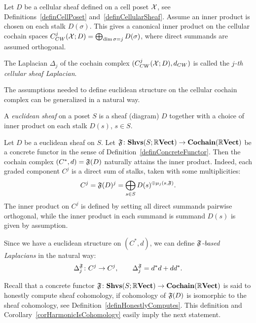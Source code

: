 \begin{con}\label{conInnerProductCellCpx}
Let $D$ be a cellular sheaf defined on a cell poset $\mathcal{X}$, see Definitions~\ref{definCellPoset} and~\ref{definCellularSheaf}. Assume an inner product is chosen on each stalk $D(\sigma)$. This gives a canonical inner product on the cellular cochain spaces $C^j_{CW}(\mathcal{X};D)=\bigoplus_{\dim\sigma=j}D(\sigma)$, where direct summands are assumed orthogonal.
\end{con}

\begin{defin}\label{definCellSheafLaplacian}
The Laplacian $\Delta_j$ of the cochain complex $(C^j_{CW}(\mathcal{X};D),d_{CW})$ is called the \emph{$j$-th cellular sheaf Laplacian}.
\end{defin}

The assumptions needed to define euclidean structure on the cellular cochain complex can be generalized in a natural way.

\begin{defin}\label{definEuclideanSheaf}
A \emph{euclidean sheaf} on a poset $S$ is a sheaf (diagram) $D$ together with a choice of inner product on each stalk $D(s)$, $s\in S$.
\end{defin}

\begin{con}\label{conEuclideanSheaf}
Let $D$ be a euclidean sheaf on $S$. Let $\mathfrak{F}\colon\mathbf{Shvs}(S;\mathbb{R}\mathbf{Vect})\to\mathbf{Cochain}(\mathbb{R}\mathbf{Vect})$ be a concrete functor in the sense of Definition~\ref{definConcreteFunctor}. Then the cochain complex $(C^*,d)=\mathfrak{F}(D)$ naturally attains the inner product. Indeed, each graded component $C^j$ is a direct sum of stalks, taken with some multiplicities:
\begin{equation}\label{eqJthComponentOfF}
C^j=\mathfrak{F}(D)^j=\bigoplus_{s\in S}D(s)^{\oplus \mu_j(s,\mathfrak{F})}.
\end{equation}
The inner product on $C^j$ is defined by setting all direct summands pairwise orthogonal, while the inner product in each summand is summand $D(s)$ is given by assumption.

Since we have a euclidean structure on $(C^*,d)$, we can define \emph{$\mathfrak{F}$-based Laplacians} in the natural way:
\begin{equation}\label{eqFuValuedLaplacians}
\Delta_j^{\mathfrak{F}}\colon C^j\to C^j,\qquad \Delta_j^{\mathfrak{F}}=d^*d+dd^*.
\end{equation}
\end{con}

Recall that a concrete functor $\mathfrak{F}\colon\mathbf{Shvs}(S;\mathbb{R}\mathbf{Vect})\to\mathbf{Cochain}(\mathbb{R}\mathbf{Vect})$ is said to honestly compute sheaf cohomology, if cohomology of $\mathfrak{F}(D)$ is isomorphic to the sheaf cohomology, see Definition~\ref{definHonestlyComputes}. This definition and Corollary~\ref{corHarmonicIsCohomology} easily imply the next statement.

